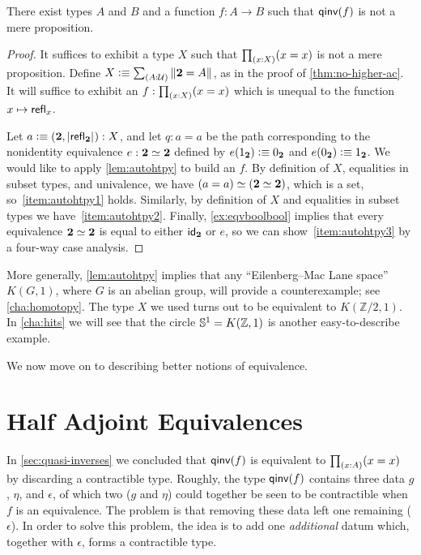 \begin{thm}
  There exist types $A$ and $B$ and a function $f:A\to B$ such that $\qinv(f)$ is not a mere proposition.
\end{thm}
\begin{proof}
  It suffices to exhibit a type $X$ such that $\prd{x:X} (x=x)$ is not a mere proposition.
  Define $X\defeq \sm{A:\type} \brck{\bool=A}$, as in the proof of \autoref{thm:no-higher-ac}.
  It will suffice to exhibit an $f:\prd{x:X} (x=x)$ which is unequal to the function $x\mapsto \refl{x}$.

  Let $a \defeq (\bool,\bproj{\refl{\bool}}) : X$, and let $q:a=a$ be the path corresponding to the nonidentity equivalence $e:\eqv\bool\bool$ defined by $e(\btrue)\defeq\bfalse$ and $e(\bfalse)\defeq\btrue$.
  We would like to apply \autoref{lem:autohtpy} to build an $f$.
  By definition of $X$, equalities in subset types, and univalence, we have $\eqv{(a=a)}{(\eqv{\bool}{\bool})}$, which is a set, so~\ref{item:autohtpy1} holds.
  Similarly, by definition of $X$ and equalities in subset types we have~\ref{item:autohtpy2}.
  Finally, \autoref{ex:eqvboolbool} implies that every equivalence $\eqv\bool\bool$ is equal to either $\idfunc[\bool]$ or $e$, so we can show~\ref{item:autohtpy3} by a four-way case analysis.
\end{proof}

More generally, \autoref{lem:autohtpy} implies that any ``Eilenberg--Mac Lane space'' $K(G,1)$, where $G$ is an abelian group, will provide a counterexample; see \autoref{cha:homotopy}.
The type $X$ we used turns out to be equivalent to $K(\mathbb{Z}/2,1)$.
In \autoref{cha:hits} we will see that the circle $\Sn^1 = K(\mathbb{Z},1)$ is another easy-to-describe example.

We now move on to describing better notions of equivalence.


\section{Half Adjoint Equivalences}
\label{sec:hae}

In \autoref{sec:quasi-inverses} we concluded that $\qinv(f)$ is equivalent to $\prd{x:A} (x=x)$ by discarding a contractible type.
Roughly, the type $\qinv(f)$ contains three data $g$, $\eta$, and $\epsilon$, of which two ($g$ and $\eta$) could together be seen to be contractible when $f$ is an equivalence.
The problem is that removing these data left one remaining ($\epsilon$).
In order to solve this problem, the idea is to add one \emph{additional} datum which, together with $\epsilon$, forms a contractible type.


